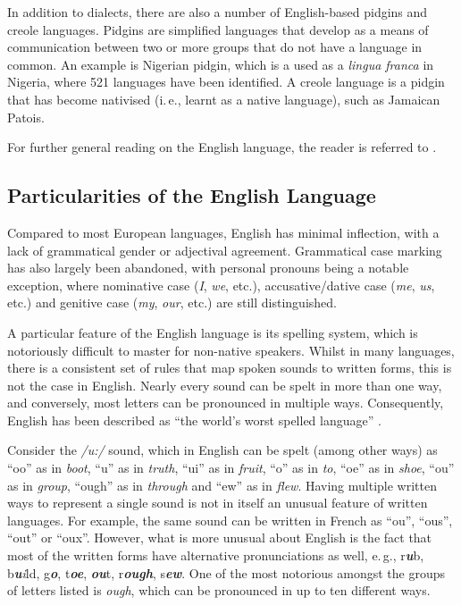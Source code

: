 \begin{multicols}{2}
In addition to dialects, there are also a number of English-based pidgins and creole languages. Pidgins are simplified languages that develop as a means of communication between two or more groups that do not have a language in common. An example is Nigerian pidgin, which is a used as a \textit{lingua franca} in Nigeria, where 521 languages have been identified. A creole language is a pidgin that has become nativised (i.\,e., learnt as a native language), such as Jamaican Patois.
    
For further general reading on the English language, the reader is referred to \cite{crystal1,crystal2,bragg,bryson}.

\subsection{Particularities of the English Language}

Compared to most European languages, English has minimal inflection, with a lack of grammatical gender or adjectival agreement. Grammatical case marking has also largely been abandoned, with personal pronouns being a notable exception, where nominative case (\textit{I}, \textit{we}, etc.), accusative/dative case (\textit{me}, \textit{us}, etc.) and genitive case (\textit{my}, \textit{our}, etc.) are still distinguished. 

A particular feature of the English language is its spelling system, which is notoriously difficult to master for non-native speakers. Whilst in many languages, there is a consistent set of rules that map spoken sounds to written forms, this is not the case in English. Nearly every sound can be spelt in more than one way, and conversely, most letters can be pronounced in multiple ways. Consequently, English has been described as ``the world's worst spelled language'' \cite{Laubach}.  

Consider the \textit{/u:/} sound, which in English can be spelt (among other ways) as ``oo'' as in \textit{boot}, ``u'' as in \textit{truth}, ``ui'' as in \textit{fruit}, ``o'' as in \textit{to}, ``oe'' as in \textit{shoe}, ``ou'' as in \textit{group}, ``ough'' as in \textit{through} and ``ew'' as in \textit{flew}. Having multiple written ways to represent a single sound is not in itself an unusual feature of written languages. For example, the same sound can be written in French as ``ou'', ``ous'', ``out'' or ``oux''. However, what is more unusual about English is the fact that most of the written forms have alternative pronunciations as well, e.\,g.,  r\textit{\textbf{u}}b, b\textit{\textbf ui}ld, g\textit{\textbf{o}}, t\textit{\textbf{oe}}, \textit{\textbf{ou}}t, r\textit{\textbf{ough}}, s\textit{\textbf{ew}}. One of the most notorious amongst the groups of letters listed is \textit{ough}, which can be pronounced in up to ten different ways. 
   

\end{multicols}
